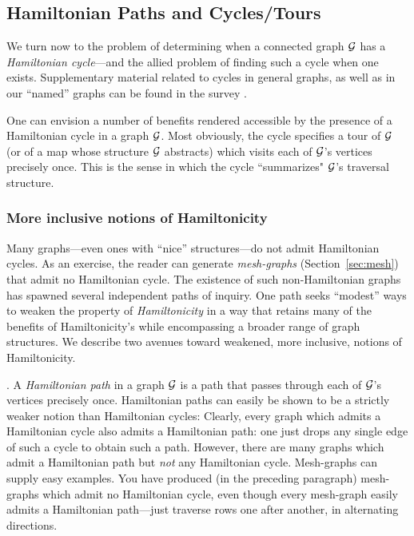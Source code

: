 
\subsection{Hamiltonian Paths and Cycles/Tours}
\label{sec:Hamiltonian-cycle}

We turn now to the problem of determining when a connected graph $\mbox{$\cal G$}$ has a {\it Hamiltonian cycle}---and the allied problem of finding such a cycle when one exists.  Supplementary material related to cycles in general graphs, as well as in our ``named'' graphs can be found in the survey \cite{Rosenberg91}.

\medskip

One can envision a number of benefits rendered accessible by the presence of a Hamiltonian cycle in a graph $\mbox{$\cal G$}$.  Most obviously, the cycle specifies a tour of $\mbox{$\cal G$}$ (or of a map whose structure $\mbox{$\cal G$}$ abstracts) which visits each of $\mbox{$\cal G$}$'s vertices precisely once.  This is the sense in which the cycle ``summarizes" $\mbox{$\cal G$}$'s traversal structure.

\subsubsection{More inclusive notions of Hamiltonicity}


Many graphs---even ones with ``nice'' structures---do not admit Hamiltonian cycles.  As an exercise, the reader can generate {\it mesh-graphs} (Section~\ref{sec:mesh}) that admit no Hamiltonian cycle.  The existence of such non-Hamiltonian graphs has spawned several
independent paths of inquiry.  One path seeks ``modest'' ways to weaken the property of {\it Hamiltonicity} in a way that retains many of the benefits of Hamiltonicity's while encompassing a broader range of graph structures.  We describe two avenues toward weakened, more inclusive, notions of Hamiltonicity.

\medskip

 

.
A {\it Hamiltonian path} in a graph $\mbox{$\cal G$}$ is a path that passes through each of $\mbox{$\cal G$}$'s vertices precisely once.  Hamiltonian paths can easily be shown to be a strictly weaker notion than Hamiltonian cycles:  Clearly, every graph which admits a Hamiltonian cycle also admits a Hamiltonian path: one just drops any single edge of such a cycle to obtain such a path.  However, there are many graphs which admit a Hamiltonian path but {\em not} any Hamiltonian cycle. Mesh-graphs can supply easy examples.  You have produced (in the preceding paragraph) mesh-graphs which admit no Hamiltonian cycle, even though every mesh-graph easily admits a Hamiltonian path---just traverse rows one after another, in alternating directions.

